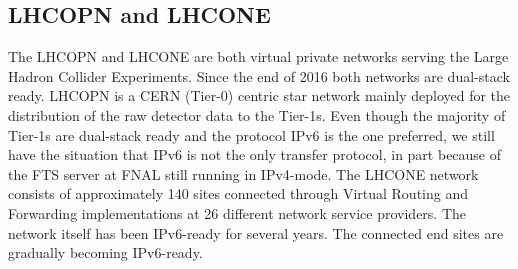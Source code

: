 \subsection{LHCOPN and LHCONE}
The LHCOPN and LHCONE are both virtual private networks serving the Large Hadron Collider Experiments. Since the end of 2016 both networks are dual-stack ready. LHCOPN is a CERN (Tier-0) centric star network mainly deployed for the distribution of the raw detector data to the Tier-1s. Even though the majority of Tier-1s are dual-stack ready and the protocol IPv6 is the one preferred, we still have the situation that IPv6 is not the only transfer protocol, in part because of the FTS server at FNAL still running in IPv4-mode. The LHCONE network consists of approximately 140 sites connected through Virtual Routing and Forwarding implementations at 26 different network service providers. The network itself has been IPv6-ready for several years. The connected end sites are gradually becoming IPv6-ready. 

